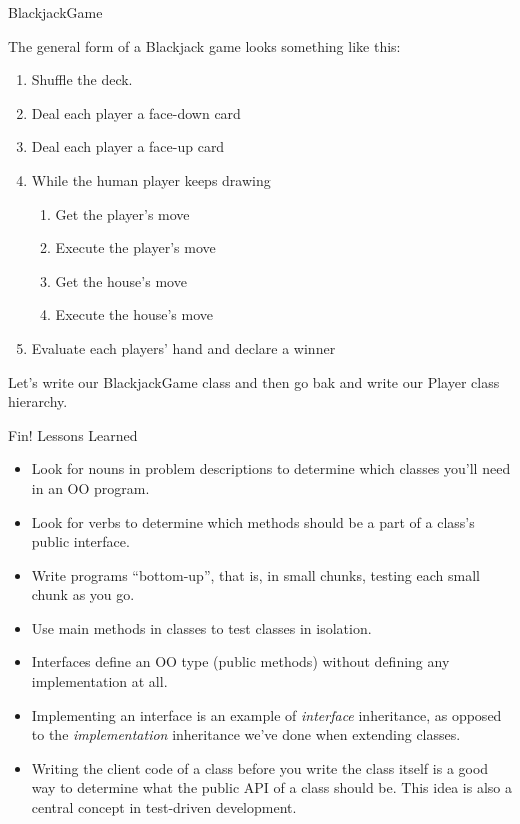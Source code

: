 \documentclass{beamer}
\begin{document}
\begin{frame}[fragile]{BlackjackGame}


The general form of a Blackjack game looks something like this:
\begin{enumerate}
\item Shuffle the deck.
\item Deal each player a face-down card
\item Deal each player a face-up card
\item While the human player keeps drawing
\begin{enumerate}
\item Get the player's move
\item Execute the player's move
\item Get the house's move
\item Execute the house's move
\end{enumerate}
\item Evaluate each players' hand and declare a winner
\end{enumerate}

Let's write our BlackjackGame class and then go bak and write our Player class hierarchy.

\end{frame}

\begin{frame}[fragile]{Fin!  Lessons Learned}


\begin{itemize}
\item Look for nouns in problem descriptions to determine which classes you'll need in an OO program.
\item Look for verbs to determine which methods should be a part of a class's public interface.
\item Write programs ``bottom-up'', that is, in small chunks, testing each small chunk as you go.
\item Use main methods in classes to test classes in isolation.
\item Interfaces define an OO type (public methods) without defining any implementation at all.
\item Implementing an interface is an example of {\it interface} inheritance, as opposed to the {\it implementation} inheritance we've done when extending classes.
\item Writing the client code of a class before you write the class itself is a good way to determine what the public API of a class should be.  This idea is also a central concept in test-driven development.
\end{itemize}


\end{frame}
\end{document}
